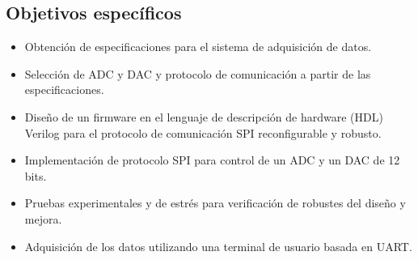 		\subsection{Objetivos específicos}
			\begin{itemize}
                \item Obtención de especificaciones para el sistema de adquisición de datos.
                \item Selección de ADC y DAC y protocolo de comunicación a partir de las especificaciones.
                \item Diseño de un firmware en el lenguaje de descripción de hardware (HDL) Verilog para el protocolo de comunicación SPI reconfigurable y robusto.
                \item Implementación de protocolo SPI para control de un ADC y un DAC de 12 bits.
                \item Pruebas experimentales y de estrés para verificación de robustes del diseño y mejora.
                \item Adquisición de los datos utilizando una terminal de usuario basada en UART.
			\end{itemize}
